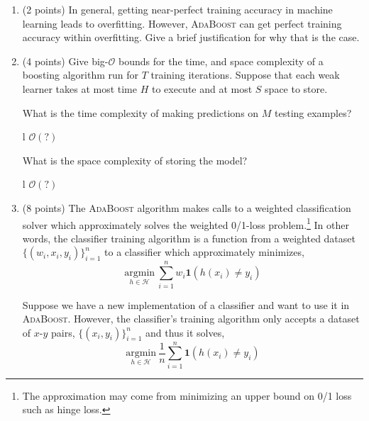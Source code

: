 \documentclass[11pt]{article}
\newcounter{QuestionCounter}
\newcounter{SubQuestionCounter}[QuestionCounter]
\newcommand{\newsubquestion}{\stepcounter{SubQuestionCounter}}
\begin{document}
{\begin{enumerate}[(1)]
\begin{answertext}{1cm}{}
  
\end{answertext}

\newpage
\newsubquestion
\item (2 points) In general, getting near-perfect training accuracy in machine learning
  leads to overfitting.  However, \textsc{AdaBoost} can get perfect training accuracy
  within overfitting.  Give a brief justification for why that is the case.

\begin{answertext}{4cm}{}

\end{answertext}


\item (4 points) Give big-$\mathcal{O}$ bounds for the time, and space complexity of a
  boosting algorithm run for $T$ training iterations.  Suppose that each weak
  learner takes at most time $H$ to execute and at most $S$ space to store.

  What is the time complexity of making predictions on $M$ testing examples?

\begin{answertable}{3cm}{}{l}
 $\mathcal{O}( ? )$
\end{answertable}


  What is the space complexity of storing the model?

\begin{answertable}{3cm}{}{l}
  $\mathcal{O}( ? )$ \\
\end{answertable}

\newpage
\item (8 points) The \textsc{AdaBoost} algorithm makes calls to a weighted classification
  solver which approximately solves the weighted 0/1-loss problem.\footnote{The
    approximation may come from minimizing an upper bound on 0/1 loss such as
    hinge loss.}  In other words, the classifier training algorithm is a
  function from a weighted dataset $\{ (w_i, x_i, y_i) \}_{i=1}^n$ to a
  classifier which approximately minimizes,
%
\begin{equation}\label{eq:weighted}
  \underset{h \in \mathcal{H}}{\mathrm{argmin}}\ \sum_{i=1}^n w_i \boldsymbol{1}(h(x_i) \ne y_i)
\end{equation}

  Suppose we have a new implementation of a classifier and want to use it in
  \textsc{AdaBoost}.  However, the classifier's training algorithm only accepts
  a dataset of $x$-$y$ pairs, $\{ (x_i, y_i) \}_{i=1}^n$ and thus it solves,
%
\begin{equation}\label{eq:unweighted}
  \underset{h \in \mathcal{H}}{\mathrm{argmin}}\ \frac{1}{n} \sum_{i=1}^n \boldsymbol{1}(h(x_i) \ne y_i)
\end{equation}


\end{enumerate}}
\end{document}
